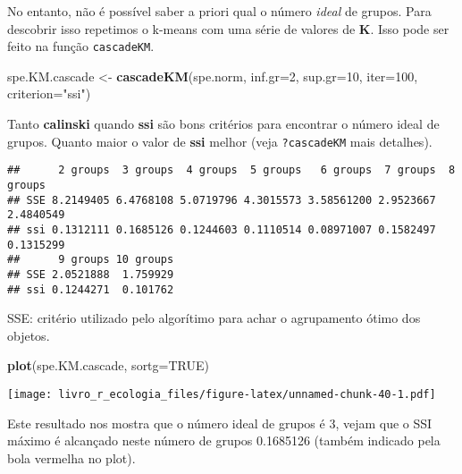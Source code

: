 \documentclass[
]{book}
\newenvironment{Shaded}{\begin{snugshade}}{\end{snugshade}}
\newcommand{\CommentTok}[1]{\textcolor[rgb]{0.56,0.35,0.01}{\textit{#1}}}
\newcommand{\DataTypeTok}[1]{\textcolor[rgb]{0.13,0.29,0.53}{#1}}
\newcommand{\DecValTok}[1]{\textcolor[rgb]{0.00,0.00,0.81}{#1}}
\newcommand{\KeywordTok}[1]{\textcolor[rgb]{0.13,0.29,0.53}{\textbf{#1}}}
\newcommand{\NormalTok}[1]{#1}
\newcommand{\OperatorTok}[1]{\textcolor[rgb]{0.81,0.36,0.00}{\textbf{#1}}}
\newcommand{\OtherTok}[1]{\textcolor[rgb]{0.56,0.35,0.01}{#1}}
\newcommand{\StringTok}[1]{\textcolor[rgb]{0.31,0.60,0.02}{#1}}
\begin{document}
No entanto, não é possível saber a priori qual o número \emph{ideal} de grupos. Para descobrir isso repetimos o k-means com uma série de valores de \textbf{K}. Isso pode ser feito na função \texttt{cascadeKM}.

\begin{Shaded}
\begin{Highlighting}[]
\NormalTok{spe.KM.cascade <-}\StringTok{ }\KeywordTok{cascadeKM}\NormalTok{(spe.norm, }\DataTypeTok{inf.gr=}\DecValTok{2}\NormalTok{, }\DataTypeTok{sup.gr=}\DecValTok{10}\NormalTok{, }\DataTypeTok{iter=}\DecValTok{100}\NormalTok{, }\DataTypeTok{criterion=}\StringTok{"ssi"}\NormalTok{) }
\end{Highlighting}
\end{Shaded}

Tanto \textbf{calinski} quando \textbf{ssi} são bons critérios para encontrar o número ideal de grupos. Quanto maior o valor de \textbf{ssi} melhor (veja \texttt{?cascadeKM} mais detalhes).

\begin{Shaded}
\end{Shaded}

\begin{verbatim}
##      2 groups  3 groups  4 groups  5 groups   6 groups  7 groups  8 groups
## SSE 8.2149405 6.4768108 5.0719796 4.3015573 3.58561200 2.9523667 2.4840549
## ssi 0.1312111 0.1685126 0.1244603 0.1110514 0.08971007 0.1582497 0.1315299
##      9 groups 10 groups
## SSE 2.0521888  1.759929
## ssi 0.1244271  0.101762
\end{verbatim}

SSE: critério utilizado pelo algorítimo para achar o agrupamento ótimo dos objetos.

\begin{Shaded}
\begin{Highlighting}[]
\KeywordTok{plot}\NormalTok{(spe.KM.cascade, }\DataTypeTok{sortg=}\OtherTok{TRUE}\NormalTok{)}
\end{Highlighting}
\end{Shaded}

\texttt{[image: livro\_r\_ecologia\_files/figure-latex/unnamed-chunk-40-1.pdf]}

Este resultado nos mostra que o número ideal de grupos é 3, vejam que o SSI máximo é alcançado neste número de grupos 0.1685126 (também indicado pela bola vermelha no plot).
\end{document}
